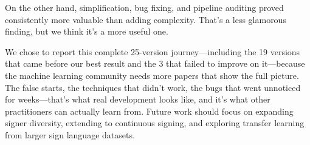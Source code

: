 \documentclass[conference]{IEEEtran}
\begin{document}
On the other hand, simplification, bug fixing, and pipeline auditing proved consistently more valuable than adding complexity. That's a less glamorous finding, but we think it's a more useful one.

We chose to report this complete 25-version journey---including the 19 versions that came before our best result and the 3 that failed to improve on it---because the machine learning community needs more papers that show the full picture. The false starts, the techniques that didn't work, the bugs that went unnoticed for weeks---that's what real development looks like, and it's what other practitioners can actually learn from. Future work should focus on expanding signer diversity, extending to continuous signing, and exploring transfer learning from larger sign language datasets.
\end{document}
